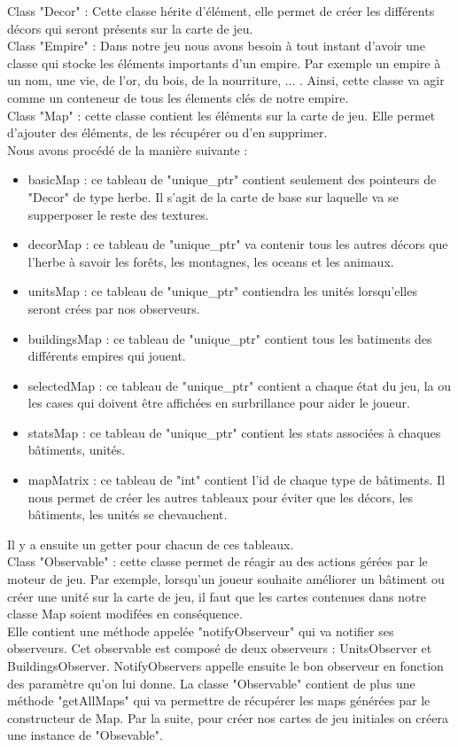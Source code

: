 \documentclass[12pt,a4paper]{article}
\begin{document}
Class "Decor" : Cette classe hérite d'élément, elle permet de créer les différents décors qui seront présents sur la carte de jeu.\\ 

Class "Empire" : Dans notre jeu nous avons besoin à tout instant d'avoir une classe qui stocke les éléments importants d'un empire. Par exemple un empire à un nom, une vie, de l'or, du bois, de la nourriture, ... . Ainsi, cette classe va agir comme un conteneur de tous les élements clés de notre empire.\\

Class "Map" : cette classe contient les éléments sur la carte de jeu. Elle permet d'ajouter des éléments, de les récupérer ou d'en supprimer. \\Nous avons procédé de la manière suivante : \begin{itemize}
    \item basicMap : ce tableau de "unique\_ptr" contient seulement des pointeurs de "Decor" de type herbe. Il s'agit de la carte de base sur laquelle va se supperposer le reste des textures. 
    \item decorMap : ce tableau de "unique\_ptr" va contenir tous les autres décors que l'herbe à savoir les forêts, les montagnes, les oceans et les animaux. 
    \item unitsMap : ce tableau de "unique\_ptr" contiendra les unités lorsqu'elles seront crées par nos observeurs. 
    \item buildingsMap : ce tableau de "unique\_ptr" contient tous les batiments des différents empires qui jouent. 
    \item selectedMap : ce tableau de "unique\_ptr" contient a chaque état du jeu, la ou les cases qui doivent être affichées en surbrillance pour aider le joueur. 
    \item statsMap : ce tableau de "unique\_ptr" contient les stats associées à chaques bâtiments, unités. 
    \item mapMatrix : ce tableau de "int" contient l'id de chaque type de bâtiments. Il nous permet de créer les autres tableaux pour éviter que les décors, les bâtiments, les unités se chevauchent.
\end{itemize}
Il y a ensuite un getter pour chacun de ces tableaux. \\

Class "Observable" : cette classe permet de réagir au des actions gérées par le moteur de jeu. Par exemple, lorsqu'un joueur souhaite améliorer un bâtiment ou créer une unité sur la carte de jeu, il faut que les cartes contenues dans notre classe Map soient modifées en conséquence.\\ Elle contient une méthode appelée "notifyObserveur" qui va notifier ses observeurs. Cet observable est composé de deux observeurs : UnitsObserver et BuildingsObserver. NotifyObservers appelle ensuite le bon observeur en fonction des paramètre qu'on lui donne. La classe "Observable" contient de plus une méthode "getAllMaps" qui va permettre de récupérer les maps générées par le constructeur de Map. Par la suite, pour créer nos cartes de jeu initiales on créera une instance de "Obsevable".\\
\end{document}

